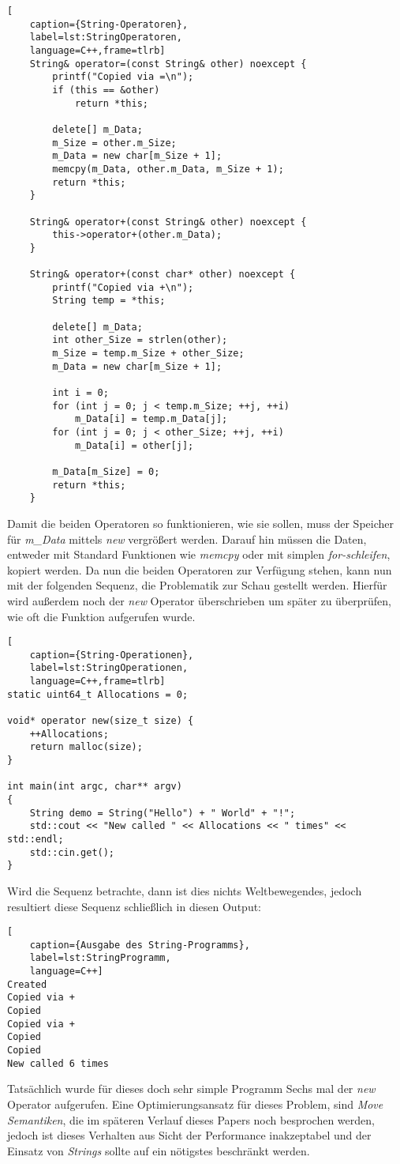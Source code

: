 \begin{lstlisting}[
    caption={String-Operatoren},
    label=lst:StringOperatoren,
    language=C++,frame=tlrb]
	String& operator=(const String& other) noexcept {
		printf("Copied via =\n");
		if (this == &other)
			return *this;

		delete[] m_Data;
		m_Size = other.m_Size;
		m_Data = new char[m_Size + 1];
		memcpy(m_Data, other.m_Data, m_Size + 1);
		return *this;
	}

	String& operator+(const String& other) noexcept {
		this->operator+(other.m_Data);
	}

	String& operator+(const char* other) noexcept {
		printf("Copied via +\n");
		String temp = *this;

		delete[] m_Data;
		int other_Size = strlen(other);
		m_Size = temp.m_Size + other_Size;
		m_Data = new char[m_Size + 1];

		int i = 0;
		for (int j = 0; j < temp.m_Size; ++j, ++i)
			m_Data[i] = temp.m_Data[j];
		for (int j = 0; j < other_Size; ++j, ++i)
			m_Data[i] = other[j];

		m_Data[m_Size] = 0;
		return *this;
	}
\end{lstlisting}

Damit die beiden Operatoren so funktionieren, wie sie sollen, muss der Speicher für \emph{m\_Data}
mittels \emph{new} vergrößert werden. Darauf hin müssen die Daten, entweder mit Standard Funktionen
wie \emph{memcpy} oder mit simplen \emph{for-schleifen}, kopiert werden.
\newline
\newline
Da nun die beiden Operatoren zur Verfügung stehen, kann nun mit der folgenden Sequenz, die
Problematik zur Schau gestellt werden. Hierfür wird außerdem noch der \emph{new} Operator
überschrieben um später zu überprüfen, wie oft die Funktion aufgerufen wurde.

\begin{lstlisting}[
    caption={String-Operationen},
    label=lst:StringOperationen,
    language=C++,frame=tlrb]
static uint64_t Allocations = 0;

void* operator new(size_t size) {
	++Allocations;
	return malloc(size);
}

int main(int argc, char** argv)
{
	String demo = String("Hello") + " World" + "!";
	std::cout << "New called " << Allocations << " times" << std::endl;
	std::cin.get();
}
\end{lstlisting}
Wird die Sequenz betrachte, dann ist dies nichts Weltbewegendes, jedoch resultiert diese Sequenz
schließlich in diesen Output:

\begin{lstlisting}[
    caption={Ausgabe des String-Programms},
    label=lst:StringProgramm,
    language=C++]
Created
Copied via +
Copied
Copied via +
Copied
Copied
New called 6 times
\end{lstlisting}

Tatsächlich wurde für dieses doch sehr simple Programm Sechs mal der \emph{new} Operator
aufgerufen. Eine Optimierungsansatz für dieses Problem, sind \emph{Move Semantiken}, die im
späteren Verlauf dieses Papers noch besprochen werden, jedoch ist dieses Verhalten aus Sicht der
Performance inakzeptabel und der Einsatz von \emph{Strings} sollte auf ein nötigstes beschränkt
werden.
